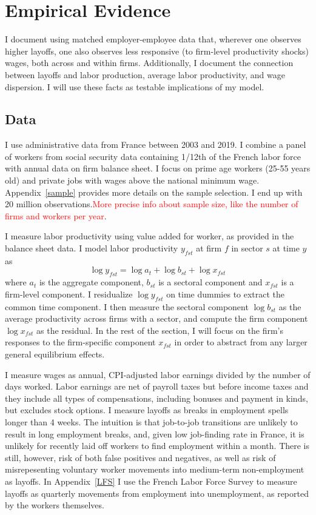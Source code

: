 \section{Empirical Evidence}
I document using matched employer-employee data that, wherever one observes higher layoffs, one also observes less responsive (to firm-level productivity shocks) wages, both across and within firms. Additionally, I document the connection between layoffs and labor production, average labor productivity, and wage dispersion. I will use these facts as testable implications of my model.

\subsection*{Data}
I use administrative data from France between 2003 and 2019. I combine a panel of workers from social security data containing 1/12th of the French labor force with annual data on firm balance sheet.  I focus on prime age workers (25-55 years old) and private jobs with wages above the national minimum wage. Appendix~\ref{sample} provides more details on the sample selection. I end up with 20 million observations.\textcolor{red}{More precise info about sample size, like the number of firms and workers per year}.

I measure labor productivity using value added for worker, as provided in the balance sheet data. I model labor productivity $y_{fst}$ at firm $f$ in sector $s$ at time $y$ as 
\[ \log y_{fst} = \log a_t + \log b_{st}+ \log x_{fst}\]
where $a_t$ is the aggregate component, $b_{st}$ is a sectoral component and $x_{fst}$ is a firm-level component. I residualize $\log y_{fst}$ on time dummies to extract the common time component. I then measure the sectoral component $\log b_{st}$ as the average productivity across firms with a sector, and compute the firm component $\log x_{fst}$ as the residual. In the rest of the section, I will focus on the firm's responses to the firm-specific component $x_{fst}$ in order to abstract from any larger general equilibrium effects.

I measure wages as annual, CPI-adjusted labor earnings divided by the number of days worked. Labor earnings are net of payroll taxes but before income
taxes and they include all types of compensations, including bonuses and payment in kinds, but excludes stock options.
I measure layoffs as breaks in employment spells longer than 4 weeks. The intuition is that job-to-job transitions are unlikely to result in long employment breaks, and, given low job-finding rate in France, it is unlikely for recently laid off workers to find employment within a month. There is still, however, risk of both false positives and negatives, as well as risk of misrepesenting voluntary worker movements into medium-term non-employment as layoffs. In Appendix~\ref{LFS} I use the French Labor Force Survey to measure layoffs as quarterly movements from employment into unemployment, as reported by the workers themselves.
